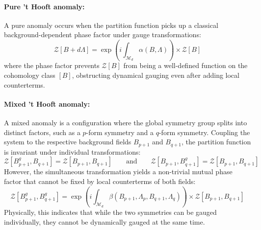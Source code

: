 \documentclass[aps,preprint,nofootinbib,preprintnumbers,eqsecnum,superscriptaddress]{revtex4}
\numberwithin{equation}{section}
\begin{document}
\paragraph*{Pure 't Hooft anomaly:} A pure anomaly occurs when the partition function picks up a classical background-dependent phase factor under gauge transformations:
\begin{equation}
\label{eq:pure_anomaly}
    \mathcal{Z}[B + d\Lambda] = \exp\left(i \int_{\mathcal{M}_d} \alpha(B, \Lambda)\right) \times \mathcal{Z}[B] 
\end{equation}
where the phase factor prevents $\mathcal{Z}[B]$ from being a well-defined function on the cohomology class $[B]$, obstructing dynamical gauging even after adding local counterterms.

\paragraph*{Mixed 't Hooft anomaly:} A mixed anomaly is a configuration where the global symmetry group splits into distinct factors, such as a $p$-form symmetry and a $q$-form symmetry. Coupling the system to the respective background fields $B_{p+1}$ and $B_{q+1}$, the partition function is invariant under individual transformations:
\begin{equation}
    \mathcal{Z}[B_{p+1}^g, B_{q+1}] = \mathcal{Z}[B_{p+1}, B_{q+1}] \qquad \text{and} \qquad \mathcal{Z}[B_{p+1}, B_{q+1}^g] = \mathcal{Z}[B_{p+1}, B_{q+1}]
\end{equation}
However, the simultaneous transformation yields a non-trivial mutual phase factor that cannot be fixed by local counterterms of both fields:
\begin{equation}
    \mathcal{Z}[B_{p+1}^g, B_{q+1}^g] = \exp\left(i \int_{\mathcal{M}_d} \beta(B_{p+1}, \Lambda_p, B_{q+1}, \Lambda_q)\right) \times \mathcal{Z}[B_{p+1}, B_{q+1}] 
\end{equation}
Physically, this indicates that while the two symmetries can be gauged individually, they cannot be dynamically gauged at the same time.
\end{document}
